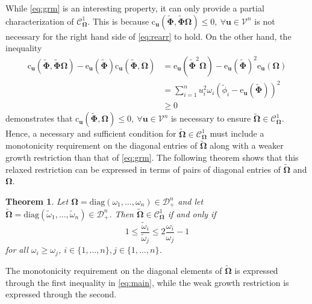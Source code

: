 \documentclass[12pt]{article}
\newtheorem{theorem}{Theorem}
\newcommand{\bl}[1]{{\mathbf #1}}
\newcommand{\bs}[1]{\boldsymbol #1}
\begin{document}
While \eqref{eq:grm} is an interesting property, it can only provide a partial characterization of $\mathcal{C}^1_{\bs{\Omega}}$. This is because $\mathrm{c}_{\bl{u}}(\tilde{\bs{\Phi}}, \tilde{\bs{\Phi}}\bs{\Omega}) \leq 0,~\forall \bl{u} \in \mathcal{V}^n$ is not necessary for the right hand side of \eqref{eq:rearr} to hold. On the other hand, the inequality
\begin{equation*}
\begin{aligned}
    \mathrm{c}_{\bl{u}}(\tilde{\bs{\Phi}}, \tilde{\bs{\Phi}}\bs{\Omega}) - \mathrm{e}_{\bl{u}}(\tilde{\bs{\Phi}}) \mathrm{c}_{\bl{u}}(\tilde{\bs{\Phi}}, \bs{\Omega}) &= \mathrm{e}_{\bl{u}}(\tilde{\bs{\Phi}}^2 \bs{\Omega}) - \mathrm{e}_{\bl{u}}(\tilde{\bs{\Phi}})^2 \mathrm{e}_{\bl{u}}(\bs{\Omega}) \\
    &= \sum_{i=1}^n u_i^2 \omega_i (\tilde{\phi}_i - \mathrm{e}_{\bl{u}}(\tilde{\bs{\Phi}}))^2 \\
    &\geq 0
\end{aligned}
\end{equation*}
demonstrates that $\mathrm{c}_{\bl{u}}(\tilde{\bs{\Phi}}, \bs{\Omega}) \leq 0,~\forall \bl{u} \in \mathcal{V}^n$ is necessary to ensure $\tilde{\bs{\Omega}} \in \mathcal{C}^1_{\bs{\Omega}}$. Hence, a necessary and sufficient condition for $\tilde{\bs{\Omega}} \in \mathcal{C}^1_{\bs{\Omega}}$ must include a monotonicity requirement on the diagonal entries of $\tilde{\bs{\Omega}}$ along with a weaker growth restriction than that of \eqref{eq:grm}. The following theorem shows that this relaxed restriction can be expressed in terms of pairs of diagonal entries of $\tilde{\bs{\Omega}}$ and $\bs{\Omega}$.
\begin{theorem}\label{thm:main}
Let $\bs{\Omega} = \mathrm{diag}(\omega_1, \dots, \omega_n) \in \mathcal{D}_+^n$ and let $\tilde{\bs{\Omega}} = \mathrm{diag}(\tilde{\omega}_1, \dots, \tilde{\omega}_n) \in \mathcal{D}_+^n$. Then $\tilde{\bs{\Omega}} \in \mathcal{C}^1_{\bs{\Omega}}$ if and only if
\begin{equation}\label{eq:main}
    1 \leq \frac{\tilde{\omega}_i}{\tilde{\omega}_j} \leq 2\frac{\omega_i}{\omega_j} - 1
\end{equation}
for all $\omega_i \geq \omega_j$, $i \in \{1, \dots, n\}, j \in \{1, \dots, n\}$.
\end{theorem}
The monotonicity requirement on the diagonal elements of $\tilde{\bs{\Omega}}$ is expressed through the first inequality in \eqref{eq:main}, while the weak growth restriction is expressed through the second.
\end{document}
